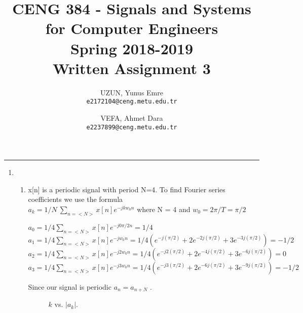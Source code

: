 \documentclass[10pt,a4paper, margin=1in]{article}
\author{
  UZUN, Yunus Emre\\
  \texttt{e2172104@ceng.metu.edu.tr}
  \and
  VEFA, Ahmet Dara\\
  \texttt{e2237899@ceng.metu.edu.tr}
}
\title{CENG 384 - Signals and Systems for Computer Engineers \\
Spring 2018-2019 \\
Written Assignment 3}
\begin{document}
\maketitle

\noindent\rule{19cm}{1.2pt}

\begin{enumerate}

\item 
    \begin{enumerate}
    \item %
     x[n] is a periodic signal with period N=4. To find Fourier series coefficients we use the formula \\ $a_k = 1/N\ \sum_{n = <N>} x[n]e^{-jkw_0n}$ where N = 4 and $w_0 = 2\pi / T = \pi /2$
    \begin{center}
       $a_0 = 1/4\sum_{n = <N>} x[n]e^{-j0\pi/2n} = 1/4$ \\ $ $ \\
       $a_1 = 1/4\sum_{n = <N>} x[n]e^{-jw_0n} = 1/4(e^{-j(\pi/2)} + 2e^{-2j(\pi/2)} + 3e^{-3j(\pi/2)}) = -1/2$
       $a_2 = 1/4\sum_{n = <N>} x[n]e^{-j2w_0n} = 1/4(e^{-j2(\pi/2)} + 2e^{-4j(\pi/2)} + 3e^{-6j(\pi/2)}) = 0$
       $a_3 = 1/4\sum_{n = <N>} x[n]e^{-j3w_0n} = 1/4(e^{-j3(\pi/2)} + 2e^{-6j(\pi/2)} + 3e^{-9j(\pi/2)}) = -1/2$
    \end{center}
    Since our signal is periodic $a_n = a_{n+N}$ . 
    \begin{figure} [H]
    \centering
    \caption{$k$ vs. $|a_k|$.}
    \label{fig:q1a}
\end{figure}
        

\end{enumerate}
\end{enumerate}
\end{document}
